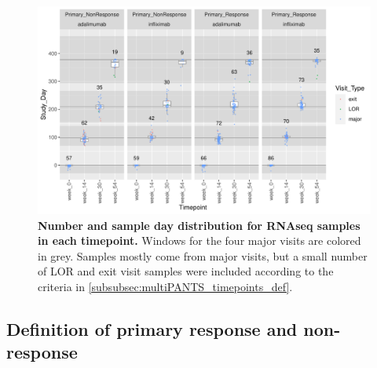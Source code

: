 \begin{figure}
    \centering
    \includegraphics[width=1.0\textwidth,page=1]{mainmatter/figures/chapter_04/process_pheno.pheno_filtered_dge.Study_Day_vs_Visit_Label.pdf}
    \caption{
        \textbf{Number and sample day distribution for \gls{RNAseq} samples in each timepoint.}
        Windows for the four major visits are colored in grey. Samples mostly come from major visits, but a small number of \gls{LOR} and exit visit samples were included according to the criteria in \cref{subsubsec:multiPANTS_timepoints_def}.
    }
    \label{fig:multipants_studyDay_boxplots}
\end{figure}

\subsection{Definition of primary response and non-response}
\label{multiPANTS:PR_definition}

